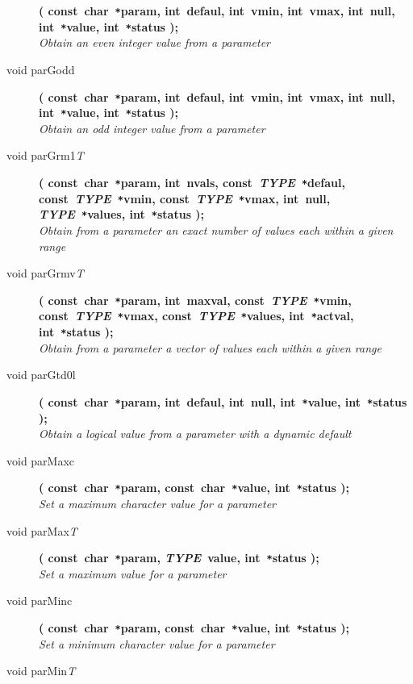 \documentclass[twoside,11pt]{article}
\begin{document}
\begin{flushleft}
\begin{description}
\textbf{( const~char~\texttt{*}param, int~defaul, int~vmin, int~vmax,
               int~null, int~\texttt{*}value, int~\texttt{*}status );} \\
\textit{Obtain an even integer value from a parameter}
\item[void parGodd]
\textbf{( const~char~\texttt{*}param, int~defaul, int~vmin, int~vmax,
              int~null, int~\texttt{*}value, int~\texttt{*}status );} \\
\textit{Obtain an odd integer value from a parameter}
\item[void parGrm1\textit{T}]
\textbf{( const~char~\texttt{*}param, int~nvals,
               const~\textit{TYPE}~\texttt{*}defaul, 
               const~\textit{TYPE}~\texttt{*}vmin,
               const~\textit{TYPE}~\texttt{*}vmax, int~null,
               \textit{TYPE}~\texttt{*}values, int~\texttt{*}status );} \\
\textit{Obtain from a parameter an exact number of values each within a
            given range}
\item[void parGrmv\textit{T}]
\textbf{( const~char~\texttt{*}param, int~maxval,
               const~\textit{TYPE}~\texttt{*}vmin, 
               const~\textit{TYPE}~\texttt{*}vmax,
               const~\textit{TYPE}~\texttt{*}values, int~\texttt{*}actval,
               int~\texttt{*}status );} \\
\textit{Obtain from a parameter a vector of values each within a given
            range}
\item[void parGtd0l]
\textbf{( const~char~\texttt{*}param, int~defaul, int~null,
          int~\texttt{*}value, int~\texttt{*}status );}\\
\textit{Obtain a logical value from a parameter with a dynamic default}
\item[void parMaxc]
\textbf{( const~char~\texttt{*}param, const~char~\texttt{*}value,
          int~\texttt{*}status );}\\
\textit{Set a maximum character value for a parameter}
\item[void parMax\textit{T}]
\textbf{( const~char~\texttt{*}param, \textit{TYPE}~value,
          int~\texttt{*}status );}\\
\textit{Set a maximum value for a parameter}
\item[void parMinc]
\textbf{( const~char~\texttt{*}param, const~char~\texttt{*}value,
          int~\texttt{*}status );}\\
\textit{Set a minimum character value for a parameter}
\item[void parMin\textit{T}]

\end{description}
\end{flushleft}
\end{document}
